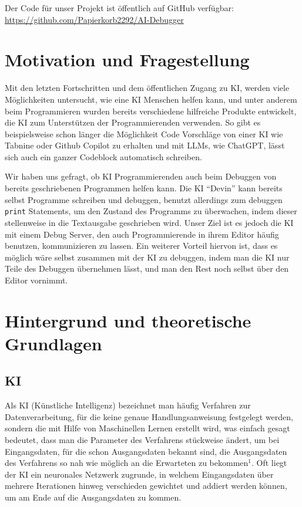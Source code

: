 \documentclass[a4paper,12pt,ngerman]{scrartcl}
\begin{document}
Der Code für unser Projekt ist öffentlich auf GitHub verfügbar: \url{https://github.com/Papierkorb2292/AI-Debugger}

\section{Motivation und Fragestellung}

Mit den letzten Fortschritten und dem öffentlichen Zugang zu KI, werden viele Möglichkeiten untersucht, wie eine KI Menschen helfen kann, und unter anderem beim Programmieren wurden bereits verschiedene hilfreiche Produkte entwickelt, die KI zum Unterstützen der Programmierenden verwenden. So gibt es beispielsweise schon länger die Möglichkeit Code Vorschläge von einer KI wie Tabnine oder Github Copilot zu erhalten und mit LLMs, wie ChatGPT, lässt sich auch ein ganzer Codeblock automatisch schreiben.

Wir haben uns gefragt, ob KI Programmierenden auch beim Debuggen von bereits geschriebenen Programmen helfen kann. Die KI ``Devin'' kann bereits selbst Programme schreiben und debuggen, benutzt allerdings zum debuggen \texttt{print} Statements, um den Zustand des Programms zu überwachen, indem dieser stellenweise in die Textausgabe geschrieben wird. Unser Ziel ist es jedoch die KI mit einem Debug Server, den auch Programmierende in ihrem Editor häufig benutzen, kommunizieren zu lassen. Ein weiterer Vorteil hiervon ist, dass es möglich wäre selbst zusammen mit der KI zu debuggen, indem man die KI nur Teile des Debuggen übernehmen lässt, und man den Rest noch selbst über den Editor vornimmt.

\section{Hintergrund und theoretische Grundlagen}

\subsection{KI}

Als KI (Künstliche Intelligenz) bezeichnet man häufig Verfahren zur Datenverarbeitung, für die keine genaue Handlungsanweisung festgelegt werden, sondern die mit Hilfe von Maschinellen Lernen erstellt wird, was einfach gesagt bedeutet, dass man die Parameter des Verfahrens stückweise ändert, um bei Eingangsdaten, für die schon Ausgangsdaten bekannt sind, die Ausgangsdaten des Verfahrens so nah wie möglich an die Erwarteten zu bekommen$^1$. Oft liegt der KI ein neuronales Netzwerk zugrunde, in welchem Eingangsdaten über mehrere Iterationen hinweg verschieden gewichtet und addiert werden können, um am Ende auf die Ausgangsdaten zu kommen.
\end{document}
